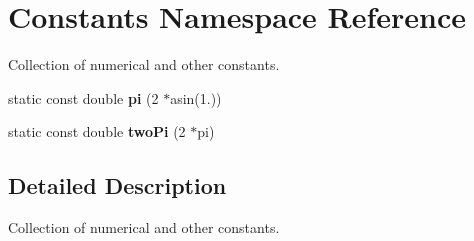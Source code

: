 \hypertarget{namespaceConstants}{
\section{Constants Namespace Reference}
\label{namespaceConstants}
}
Collection of numerical and other constants.  


\begin{CompactItemize}
\item 
\hypertarget{namespaceConstants_3db0a9b097b2de79bfb61a6c29779356}{
static const double \textbf{pi} (2 $\ast$asin(1.))}
\label{namespaceConstants_3db0a9b097b2de79bfb61a6c29779356}

\item 
\hypertarget{namespaceConstants_7b24ddbee45a9bf2801a98abd4243667}{
static const double \textbf{two\-Pi} (2 $\ast$pi)}
\label{namespaceConstants_7b24ddbee45a9bf2801a98abd4243667}

\end{CompactItemize}


\subsection{Detailed Description}
Collection of numerical and other constants. 